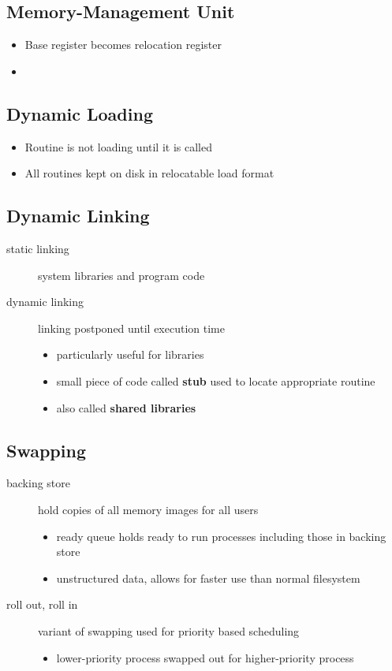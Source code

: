 \documentclass[11pt]{article}
\begin{document}
\subsection{Memory-Management Unit}
\label{sec:org2d1389b}
\begin{itemize}
\item Base register becomes relocation register
\item 
\end{itemize}
\subsection{Dynamic Loading}
\label{sec:org5855443}
\begin{itemize}
\item Routine is not loading until it is called
\item All routines kept on disk in relocatable load format
\end{itemize}
\subsection{Dynamic Linking}
\label{sec:org4e007fd}
\begin{description}
\item[{static linking}] system libraries and program code
\item[{dynamic linking}] linking postponed until execution time
\begin{itemize}
\item particularly useful for libraries
\item small piece of code called \textbf{stub} used to locate appropriate routine
\item also called \textbf{shared libraries}
\end{itemize}
\end{description}
\subsection{Swapping}
\label{sec:org91b7182}
\begin{description}
\item[{backing store}] hold copies of all memory images for all users
\begin{itemize}
\item ready queue holds ready to run processes including those in backing store
\item unstructured data, allows for faster use than normal filesystem
\end{itemize}
\item[{roll out, roll in}] variant of swapping used for priority based scheduling
\begin{itemize}
\item lower-priority process swapped out for higher-priority process
\end{itemize}
\end{description}
\end{document}
